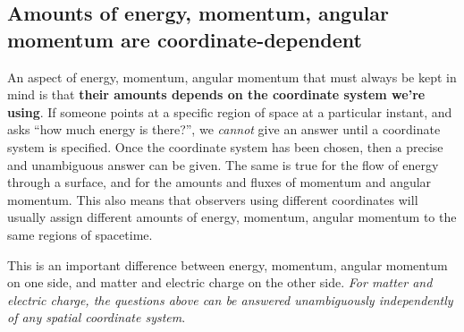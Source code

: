 \documentclass[a4paper,12pt,%
onecolumn,oneside,%
british%
]{memoir}
\renewcommand*{\|}[1][]{\nonscript\:#1\vert\nonscript\:\mathopen{}}
\begin{document}
\subsection{Amounts of energy, momentum, angular momentum are coordinate-dependent}
\label{sec:energy_momentum_angmomentum_coords}


An aspect of energy, momentum, angular momentum that must always be kept in mind is that \textbf{their amounts depends on the coordinate system we're using}. If someone points at a specific region of space at a particular instant, and asks \enquote{how much energy is there?}, we \emph{cannot} give an answer until a coordinate system is specified. Once the coordinate system has been chosen, then a precise and unambiguous answer can be given. The same is true for the flow of energy through a surface, and for the amounts and fluxes of momentum and angular momentum. This also means that observers using different coordinates will usually assign different amounts of energy, momentum, angular momentum to the same regions of spacetime.

This is an important difference between energy, momentum, angular momentum on one side, and matter and electric charge on the other side. \emph{For matter and electric charge, the questions above can be answered unambiguously independently of any spatial coordinate system}.
%
\end{document}
